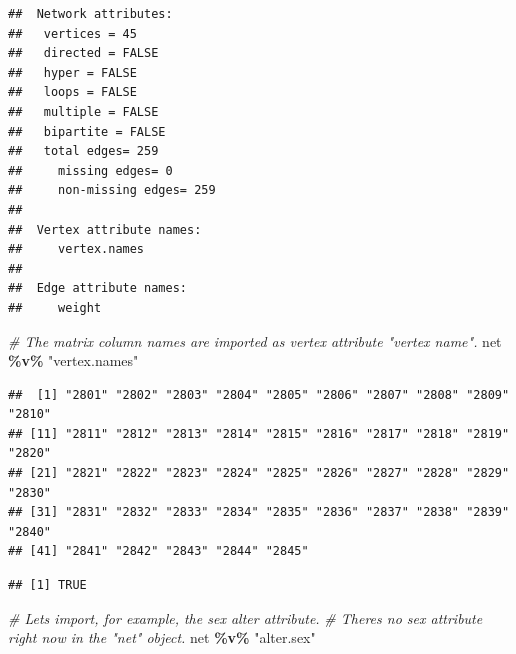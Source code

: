 \documentclass[
]{book}
\newenvironment{Shaded}{\begin{snugshade}}{\end{snugshade}}
\newcommand{\CommentTok}[1]{\textcolor[rgb]{0.56,0.35,0.01}{\textit{#1}}}
\newcommand{\FloatTok}[1]{\textcolor[rgb]{0.00,0.00,0.81}{#1}}
\newcommand{\FunctionTok}[1]{\textcolor[rgb]{0.13,0.29,0.53}{\textbf{#1}}}
\newcommand{\NormalTok}[1]{#1}
\newcommand{\OtherTok}[1]{\textcolor[rgb]{0.56,0.35,0.01}{#1}}
\newcommand{\SpecialCharTok}[1]{\textcolor[rgb]{0.81,0.36,0.00}{\textbf{#1}}}
\newcommand{\StringTok}[1]{\textcolor[rgb]{0.31,0.60,0.02}{#1}}
\begin{document}
\begin{verbatim}
##  Network attributes:
##   vertices = 45 
##   directed = FALSE 
##   hyper = FALSE 
##   loops = FALSE 
##   multiple = FALSE 
##   bipartite = FALSE 
##   total edges= 259 
##     missing edges= 0 
##     non-missing edges= 259 
## 
##  Vertex attribute names: 
##     vertex.names 
## 
##  Edge attribute names: 
##     weight
\end{verbatim}

\begin{Shaded}
\begin{Highlighting}[]
\CommentTok{\# The matrix column names are imported as vertex attribute "vertex name".}
\NormalTok{net }\SpecialCharTok{\%v\%} \StringTok{"vertex.names"}
\end{Highlighting}
\end{Shaded}

\begin{verbatim}
##  [1] "2801" "2802" "2803" "2804" "2805" "2806" "2807" "2808" "2809" "2810"
## [11] "2811" "2812" "2813" "2814" "2815" "2816" "2817" "2818" "2819" "2820"
## [21] "2821" "2822" "2823" "2824" "2825" "2826" "2827" "2828" "2829" "2830"
## [31] "2831" "2832" "2833" "2834" "2835" "2836" "2837" "2838" "2839" "2840"
## [41] "2841" "2842" "2843" "2844" "2845"
\end{verbatim}

\begin{Shaded}
\end{Shaded}

\begin{verbatim}
## [1] TRUE
\end{verbatim}

\begin{Shaded}
\begin{Highlighting}[]
\CommentTok{\# Let\textquotesingle{}s import, for example, the sex alter attribute.}
\CommentTok{\# There\textquotesingle{}s no sex attribute right now in the "net" object.}
\NormalTok{net }\SpecialCharTok{\%v\%} \StringTok{"alter.sex"}
\end{Highlighting}
\end{Shaded}
\end{document}
